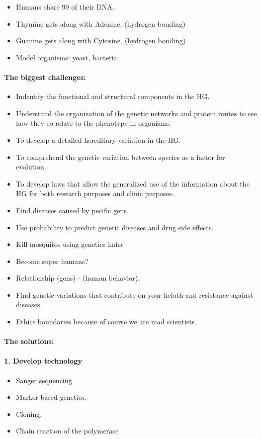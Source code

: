 \begin{itemize}
    \item Humans share 99 of their DNA.
    \item Thymine gets along with Adenine. (hydrogen bonding)
    \item Guanine gets along with Cytosine. (hydrogen bonding)
    \item Model organisms: yeast, bacteria.
\end{itemize}

\paragraph{The biggest challenges: }

\begin{itemize}
    \item Indentify the functional and structural components in the HG.
    \item Understand the organization of the genetic networks and protein routes to see how
    they co-relate to the phenotype in organisms.
    \item To develop a detailed hereditary variation in the HG.
    \item To comprehend the genetic variation between species as a factor for evolution.
    \item To develop laws that allow the generalized use of the information
    about the HG for both research purposes and clinic purposes. 
    \item Find diseases caused by pecific gens.
    \item Use probability to predict genetic diseases and drug side effects.
    \item Kill mosquitos using genetics haha
    \item Become super humans? 
    \item Relationship (gens) - (human behavior).
    \item Find genetic variations that contribute on your helath and resistance against
    diseases.
    \item Ethics boundaries because of course we are mad scientists.
\end{itemize}

\paragraph{The solutions: }

\paragraph*{1. Develop technology}
\begin{itemize}
    \item Sanger sequencing
    \item Marker based genetics.
    \item Cloning.
    \item Chain reaction of the polymerase
\end{itemize}
